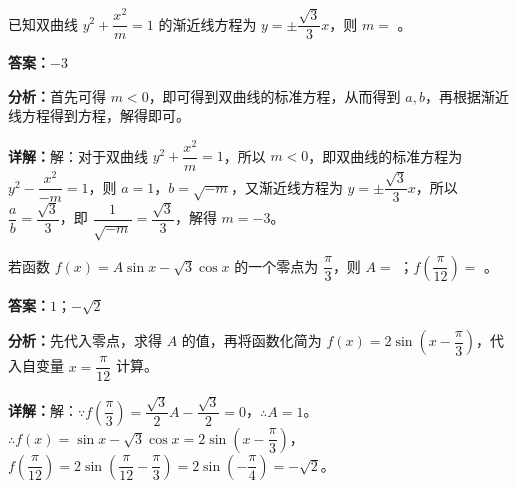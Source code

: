 \begin{question}[points=5]
已知双曲线 $y^2 + \dfrac{x^2}{m} = 1$ 的渐近线方程为 $y = \pm \dfrac{\sqrt{3}}{3} x$，则 $m =$ 。
\fillin[{$-3$}]
\begin{solution}
\textbf{答案：}$-3$

\textbf{分析：}首先可得 $m<0$，即可得到双曲线的标准方程，从而得到 $a,b$，再根据渐近线方程得到方程，解得即可。

\textbf{详解：}解：对于双曲线 $y^2 + \dfrac{x^2}{m} = 1$，所以 $m<0$，即双曲线的标准方程为 $y^2 - \dfrac{x^2}{-m} = 1$，则 $a=1$，$b = \sqrt{-m}$，又渐近线方程为 $y = \pm \dfrac{\sqrt{3}}{3} x$，所以 $\dfrac{a}{b} = \dfrac{\sqrt{3}}{3}$，即 $\dfrac{1}{\sqrt{-m}} = \dfrac{\sqrt{3}}{3}$，解得 $m = -3$。
\end{solution}
\end{question}

\begin{question}[points=5]
若函数 $f(x) = A\sin x - \sqrt{3}\cos x$ 的一个零点为 $\dfrac{\pi}{3}$，则 $A =$ ；$f\left(\dfrac{\pi}{12}\right) =$ 。
\fillin[{$1$；$-\sqrt{2}$}]
\begin{solution}
\textbf{答案：}$1$；$-\sqrt{2}$

\textbf{分析：}先代入零点，求得 $A$ 的值，再将函数化简为 $f(x) = 2\sin\left(x - \dfrac{\pi}{3}\right)$，代入自变量 $x = \dfrac{\pi}{12}$ 计算。

\textbf{详解：}解：$\because f\left(\dfrac{\pi}{3}\right) = \dfrac{\sqrt{3}}{2}A - \dfrac{\sqrt{3}}{2} = 0$，$\therefore A = 1$。
$\therefore f(x) = \sin x - \sqrt{3}\cos x = 2\sin\left(x - \dfrac{\pi}{3}\right)$，
$f\left(\dfrac{\pi}{12}\right) = 2\sin\left(\dfrac{\pi}{12} - \dfrac{\pi}{3}\right) = 2\sin\left(-\dfrac{\pi}{4}\right) = -\sqrt{2}$。
\end{solution}
\end{question}

